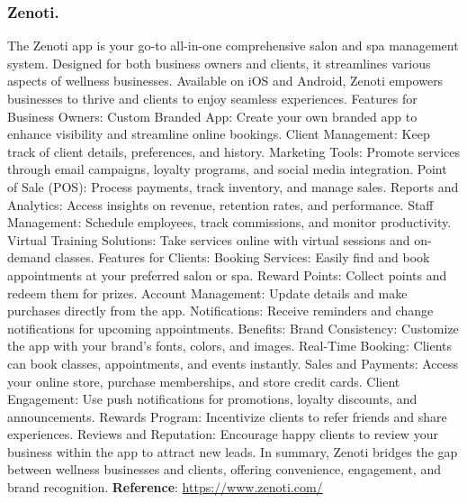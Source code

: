 \documentclass{article}
\begin{document}
      \subsubsection{Zenoti.}
      The Zenoti app is your go-to all-in-one comprehensive salon and spa management system.
      Designed for both business owners and clients, it streamlines various aspects of wellness businesses.
      Available on iOS and Android, Zenoti empowers businesses to thrive and clients to enjoy seamless experiences.
      Features for Business Owners:
      Custom Branded App: Create your own branded app to enhance visibility and streamline online bookings.
      Client Management: Keep track of client details, preferences, and history.
      Marketing Tools: Promote services through email campaigns, loyalty programs, and social media integration.
      Point of Sale (POS): Process payments, track inventory, and manage sales.
      Reports and Analytics: Access insights on revenue, retention rates, and performance.
      Staff Management: Schedule employees, track commissions, and monitor productivity.
      Virtual Training Solutions: Take services online with virtual sessions and on-demand classes.
      Features for Clients:
      Booking Services: Easily find and book appointments at your preferred salon or spa.
      Reward Points: Collect points and redeem them for prizes.
      Account Management: Update details and make purchases directly from the app.
      Notifications: Receive reminders and change notifications for upcoming appointments.
      Benefits:
      Brand Consistency: Customize the app with your brand’s fonts, colors, and images.
      Real-Time Booking: Clients can book classes, appointments, and events instantly.
      Sales and Payments: Access your online store, purchase memberships, and store credit cards.
      Client Engagement: Use push notifications for promotions, loyalty discounts, and announcements.
      Rewards Program: Incentivize clients to refer friends and share experiences.
      Reviews and Reputation:
      Encourage happy clients to review your business within the app to attract new leads.
      In summary, Zenoti bridges the gap between wellness businesses and clients, offering convenience, engagement, and brand recognition.\newline
      \textbf{Reference}: \href{https://www.zenoti.com/}{https://www.zenoti.com/}
\end{document}
